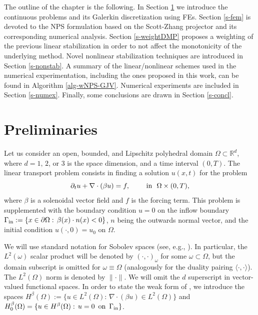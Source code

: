 The outline of the chapter is the following. In Section \ref{s-prel} we introduce the continuous problems and its
Galerkin discretization using FEs. Section \ref{s-fem} is devoted to the NPS formulation based on the Scott-Zhang projector and its corresponding numerical analysis. Section \ref{s-weightDMP} proposes a weighting of the previous linear stabilization in order to not affect the monotonicity of the underlying method. Novel nonlinear stabilization techniques are introduced in Section \ref{s-nonstab}. A summary of the linear/nonlinear schemes used in the numerical experimentation, including the ones proposed in this work, can be found in Algorithm \ref{alg-wNPS-GJV}. Numerical experiments are included in Section \ref{s-numex}. Finally, some conclusions are drawn in Section \ref{s-concl}.


\section{Preliminaries}\label{s-prel}

Let us consider an open, bounded, and Lipschitz  polyhedral domain $\Omega \subset \mathbb{R}^d$, where $d = 1,\, 2$, or $3$ is the space dimension, and a time interval $(0,T)$. The linear transport problem consists in finding a solution $u(x,t)$ for the problem
\begin{equation}\label{eq-probcont}
\partial_t u +   \nabla \cdot (\beta u) = f, \qquad \hbox{ in } \ \Omega \times (0,T),
\end{equation}
where $\beta$ is a solenoidal vector field and $f$ is the forcing term. This problem is supplemented with the boundary condition $u = 0$ on the inflow boundary $\Gamma_{\rm in} := \{ x \in \partial \Omega: \, \beta(x) \cdot n(x) < 0\}$, $n$ being the outwards normal vector, and the initial condition $u(\cdot,0) = u_0$ on $\Omega$. %

We will use standard notation for Sobolev spaces (see, e.g., \cite{brezis_functional_2010}). In particular, the $L^2(\omega)$ scalar product will be denoted by $(\cdot,\cdot)_\omega$ for some $\omega \subset \Omega$, but the domain subscript is omitted for $\omega \equiv \Omega$ (analogously for the duality pairing $\langle \cdot,\cdot \rangle$). The $L^2(\Omega)$ norm is denoted by $\|\cdot\|$. 
We will omit the $d$ superscript in vector-valued functional spaces. In order to state the weak form of , we introduce the spaces $H^\beta(\Omega) := \{ u \in L^2(\Omega): \,  \nabla \cdot (\beta u) \in L^2(\Omega) \}$ and $H_0^\beta(\Omega) = \{ u \in H^\beta(\Omega):\, u = 0 \, \hbox{ on } \,\Gamma_{\rm in}\}$. 

